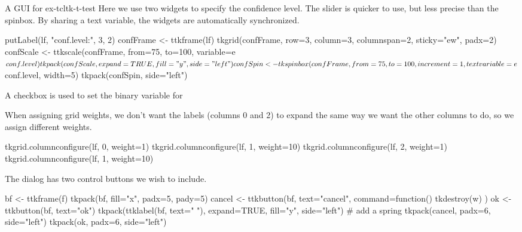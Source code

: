 \begin{example}{A GUI for }{ex-tcltk-t-test}
Here we use two widgets to specify the confidence level. The slider
is quicker to use, but less precise than the spinbox. By sharing a
text variable, the widgets are automatically synchronized.
\begin{Schunk}
\begin{Sinput}
 putLabel(lf, "conf.level:", 3, 2)
 confFrame <- ttkframe(lf)
 tkgrid(confFrame, row=3, column=3, columnspan=2, 
        sticky="ew", padx=2)
 confScale <- ttkscale(confFrame, from=75, to=100, 
                      variable=e$conf.level)
 tkpack(confScale, expand=TRUE, fill="y", side="left")
 confSpin <- tkspinbox(confFrame, from=75, to=100, increment=1, 
                      textvariable=e$conf.level, width=5)
 tkpack(confSpin, side="left")
\end{Sinput}
\end{Schunk}

A checkbox is used to set the binary variable for 
\begin{Schunk}
\end{Schunk}

When assigning grid weights, we don't want the labels (columns 0 and 2) to expand the same way we want the other columns to do, so we assign different weights.
\begin{Schunk}
\begin{Sinput}
 tkgrid.columnconfigure(lf, 0, weight=1)
 tkgrid.columnconfigure(lf, 1, weight=10)
 tkgrid.columnconfigure(lf, 2, weight=1)
 tkgrid.columnconfigure(lf, 1, weight=10)
\end{Sinput}
\end{Schunk}

The dialog has two control buttons we wish to include.
\begin{Schunk}
\begin{Sinput}
 bf <- ttkframe(f)
 tkpack(bf, fill="x", padx=5, pady=5)
 cancel <- ttkbutton(bf, text="cancel", command=function() {
   tkdestroy(w)
 })
 ok <- ttkbutton(bf, text="ok")
 tkpack(ttklabel(bf, text=" "), expand=TRUE, fill="y", 
        side="left")                     # add a spring
 tkpack(cancel, padx=6, side="left")
 tkpack(ok, padx=6, side="left")
\end{Sinput}
\end{Schunk}


\end{example}
